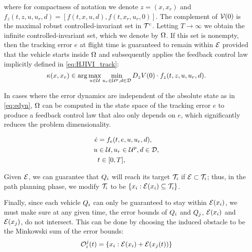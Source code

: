 \noindent where for compactness of notation we denote $z=(x,x_r)$ and $f_z(t,z,u,u_r,d) = [f(t,x,u,d),f(t,x_r,u_r,0)]$. The complement of $\mathcal{V}(0)$ is the maximal robust controlled-invariant set in $\mathcal{T}^\text{c}$. Letting $T\to\infty$ we obtain the infinite controlled-invariant set, which we denote by $\Omega$. If this set is nonempty, then the tracking error $e$ at flight time is guaranteed to remain within $\mathcal{E}$ provided that the vehicle starts inside $\Omega$ and subsequently applies the feedback control law implicitly defined in \eqref{eq:HJIVI_track}:
\begin{equation}\label{eq:robust_tracking_law}
\kappa(x,x_r) \in \arg\max_{u \in \mathcal{U}} \min_{u_r \in\mathcal{U}^p, d \in \mathcal{D}} D_z V(0) \cdot f_z(t,z,u,u_r,d).
\end{equation}

In cases where the error dynamics are independent of the absolute state as in \eqref{eq:edyn}, $\Omega$ can be computed in the state space of the tracking error $e$ to produce a feedback control law that also only depends on $e$, which significantly reduces the problem dimensionality.

\begin{equation}
\label{eq:edyn} %
\begin{aligned}
\dot{e} &= f_e(t, e, u, u_r,d), \\
u &\in \cset, u_r\in\cset^p, d \in \dset, \\
&t \in [0, T],
\end{aligned}
\end{equation}

Given $\mathcal{E}$, we can guarantee that $Q_i$ will reach its target $\mathcal{T}_i$ if $\mathcal{E} \subset \mathcal{T}_i$; thus, in the path planning phase, we modify $\mathcal{T}_i$ to be $\{x_i: \mathcal{E}(x_i) \subseteq \mathcal{T}_i\}$.

Finally, since each vehicle $Q_i$ can only be guaranteed to stay within $\mathcal{E}(x_i)$, we must make sure at any given time, the error bounds of $Q_i$ and $Q_j$, $\mathcal{E}(x_i)$ and $\mathcal{E}(x_j)$, do not intersect. This can be done by choosing the induced obstacle to be the Minkowski sum of the error bounds:
\begin{equation}
\mathcal{O}_i^j(t) = \{x_i: \mathcal{E}(x_i) + \mathcal{E}(x_j(t))\}
\end{equation}



